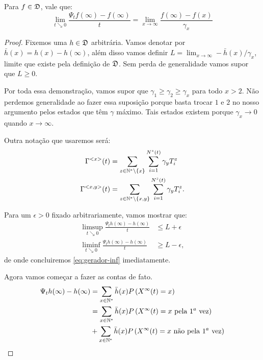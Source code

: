 \begin{proposicao}
  \label{prop:gerador-inf}
  Para $f \in {\mathfrak{D}}$, vale que:
  \begin{equation}
    \label{eq:gerador-inf}
    \lim_{t \searrow 0} \frac{\Psi_t f(\infty) - f(\infty)}{t} =
    \lim_{x \to \infty} \frac{f(\infty) - f(x)}{\gamma_x}
  \end{equation}
\end{proposicao}
\begin{proof}
  Fixemos uma $h \in {\mathfrak{D}}$ arbitrária. Vamos denotar por $\bar{h}(x) =
  h(x) - h(\infty)$, além disso vamos definir $L = \lim_{x \to \infty}
  -\bar{h}(x)/\gamma_x$, limite que existe pela definição de
  ${\mathfrak{D}}$. Sem perda de generalidade vamos supor que $L \geq 0$.

  Por toda essa demonstração, vamos supor que $\gamma_1 \geq \gamma_2
  \geq \gamma_x$ para todo $x > 2$. Não perdemos generalidade ao fazer
  essa suposição porque basta trocar $1$ e $2$ no nosso argumento pelos
  estados que têm $\gamma$ máximo. Tais estados existem porque $\gamma_x
  \to 0$ quando $x \to \infty$.

  Outra notação que usaremos será:
  \begin{align*}
    \Gamma^{<x>}(t) &= \sum_{z\in{\mathbb{N^*}}\setminus\{x\}} \sum_{i =
      1}^{N^z(t)} \gamma_y T^z_i \\
    \Gamma^{<x, y>}(t) &= \sum_{z\in{\mathbb{N^*}}\setminus\{x,y\}} \sum_{i =
      1}^{N^z(t)} \gamma_y T^z_i .
  \end{align*}


  Para um $\epsilon > 0$ fixado arbitrariamente, vamos mostrar que:
  \begin{align}
    \label{eq:gerador-inf-sup}
    \limsup_{t \searrow 0} \frac{\Psi_t h(\infty) - h(\infty)}{t} 
    &\leq L + \epsilon\\
    \label{eq:gerador-inf-inf}
    \liminf_{t \searrow 0} \frac{\Psi_t h(\infty) - h(\infty)}{t} 
    &\geq L - \epsilon,
  \end{align}
  de onde concluiremos \eqref{eq:gerador-inf} imediatamente.

  Agora vamos começar a fazer as contas de fato.
  \begin{align*}
    \Psi_t h (\infty) - h(\infty) &=
    \sum_{x \in {\mathbb{N^*}}} \bar{h}(x) P\left( X^\infty(t) = x \right)\\
    &= 
    \sum_{x \in {\mathbb{N^*}}} \bar{h}(x) P\left( X^\infty(t) = x \text{ pela } 1^{a}
        \text{ vez}\right)\\
    &+ \sum_{x \in {\mathbb{N^*}}} \bar{h}(x) P\left( X^\infty(t) = x \text{ não pela
      } 1^a \text{ vez}\right)
  \end{align*}


\end{proof}
